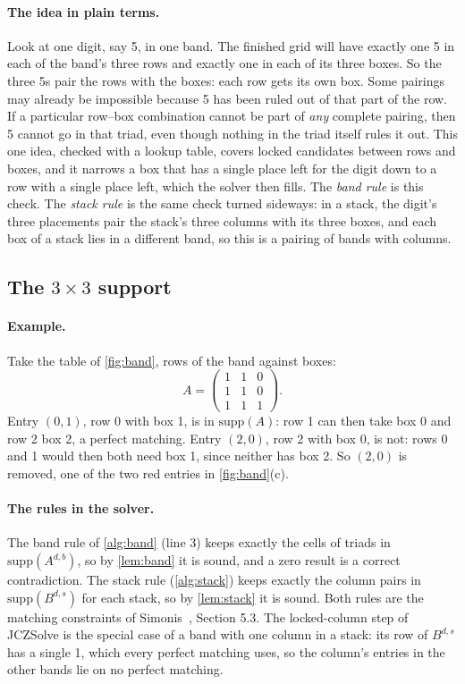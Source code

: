 \paragraph{The idea in plain terms.} Look at one digit, say 5, in one band. The finished grid will have exactly one 5
in each of the band's three rows and exactly one in each of its three boxes. So the three 5s pair the rows with the
boxes: each row gets its own box. Some pairings may already be impossible because 5 has been ruled out of that part of
the row. If a particular row--box combination cannot be part of \emph{any} complete pairing, then 5 cannot go in that
triad, even though nothing in the triad itself rules it out. This one idea, checked with a lookup table,
covers locked candidates between rows and boxes, and it narrows a box that has a single place left for the digit down
to a row with a single place left, which the solver then fills. The \emph{band rule} is this check. The \emph{stack rule} is the same check turned sideways: in a stack, the
digit's three placements pair the stack's three columns with its three boxes, and each box of a stack lies in a
different band, so this is a pairing of bands with columns.


\subsection{The $3\times 3$ support}

\paragraph{Example.} Take the table of \cref{fig:band}, rows of the band against boxes:
\[
A=\begin{pmatrix} 1 & 1 & 0 \\ 1 & 1 & 0 \\ 1 & 1 & 1 \end{pmatrix}.
\]
Entry $(0,1)$, row 0 with box 1, is in $\mathrm{supp}(A)$: row 1 can then take box 0 and row 2 box 2, a perfect
matching. Entry $(2,0)$, row 2 with box 0, is not: rows 0 and 1 would then both need box 1, since neither has box 2.
So $(2,0)$ is removed, one of the two red entries in \cref{fig:band}(c).


\paragraph{The rules in the solver.} The band rule of \cref{alg:band} (line 3) keeps exactly the cells of triads in
$\mathrm{supp}(A^{d,b})$, so by \cref{lem:band} it is sound, and a zero result is a correct contradiction. The stack rule
(\cref{alg:stack}) keeps exactly the column pairs in $\mathrm{supp}(B^{d,s})$ for each stack, so by \cref{lem:stack} it
is sound. Both rules are the matching constraints of Simonis~\cite{simonis2005sudoku}, Section 5.3. The locked-column step of
JCZSolve is the special case of a band with one column in a stack: its row of
$B^{d,s}$ has a single 1, which every perfect matching uses, so the column's entries in the other bands lie on no
perfect matching.



